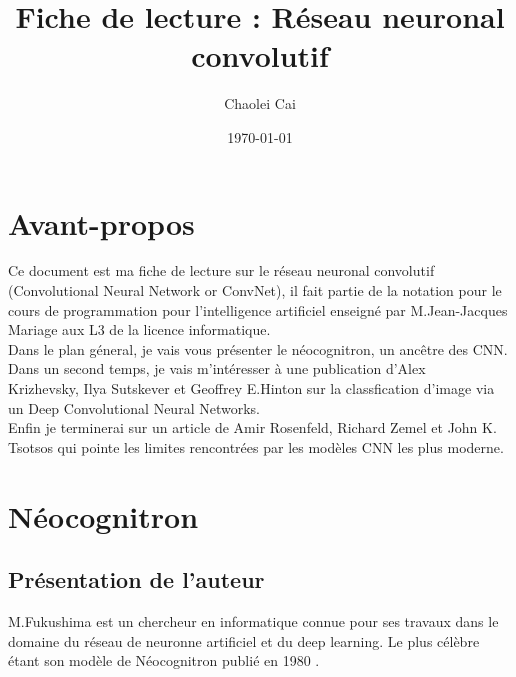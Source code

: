 \documentclass[12pt, letterpaper]{article}
\title{Fiche de lecture : Réseau neuronal convolutif}
\author{Chaolei Cai
\\
    \multicolumn{1}{
        p{.7\textwidth}}{\centering\emph{Université Paris Vincennes St-Denis\\
  UFR mathématiques, informatique, technologies sciences de l'information\\}
  L3 Informatique}
}
\date{\today}
\begin{document}
\begin{titlepage}
    \maketitle
\end{titlepage}

\tableofcontents

\section{Avant-propos}
Ce document est ma fiche de lecture sur le réseau neuronal convolutif (Convolutional Neural Network or ConvNet), il fait partie de la notation pour 
le cours de programmation pour l'intelligence artificiel enseigné par M.Jean-Jacques Mariage aux L3 de la licence informatique.\\
Dans le plan géneral, je vais vous présenter le néocognitron, un ancêtre des CNN.\\
Dans un second temps, je vais m'intéresser à une publication d'Alex \\Krizhevsky, Ilya Sutskever et Geoffrey E.Hinton sur la classfication d'image via un Deep Convolutional Neural Networks.\\
Enfin je terminerai sur un article de Amir Rosenfeld, Richard Zemel et John K. Tsotsos qui pointe les limites rencontrées par les modèles CNN les plus moderne.

\section{Néocognitron}
\subsection{Présentation de l'auteur}
M.Fukushima est un chercheur en informatique connue pour ses travaux dans le domaine du réseau de neuronne artificiel et du deep learning.
Le plus célèbre étant son modèle de Néocognitron publié en 1980 \autocite{Fukushima:1}.
\end{document}
